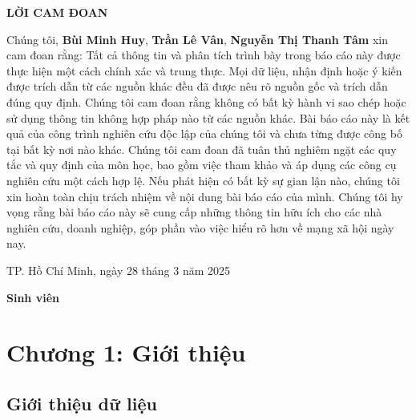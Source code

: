 \documentclass[
]{article}
\author{}
\date{\vspace{-2.5em}}
\begin{document}


\newpage
\thispagestyle{empty}

\begin{center}
    \LARGE \textbf{LỜI CAM ĐOAN}
\end{center}
\vspace{1em}

\setlength{\parindent}{2em}
\begin{flushright}
Chúng tôi, \textbf{Bùi Minh Huy}, \textbf{Trần Lê Vân}, \textbf{Nguyễn Thị Thanh Tâm} xin cam đoan rằng:
    Tất cả thông tin và phân tích trình bày trong báo cáo này được thực hiện một cách chính xác và trung thực. Mọi dữ liệu, nhận định hoặc ý kiến được trích dẫn từ các nguồn khác đều đã được nêu rõ nguồn gốc và trích dẫn đúng quy định. Chúng tôi cam đoan rằng không có bất kỳ hành vi sao chép hoặc sử dụng thông tin không hợp pháp nào từ các nguồn khác. Bài báo cáo này là kết quả của công trình nghiên cứu độc lập của chúng tôi và chưa từng được công bố tại bất kỳ nơi nào khác. Chúng tôi cam đoan đã tuân thủ nghiêm ngặt các quy tắc và quy định của môn học, bao gồm việc tham khảo và áp dụng các công cụ nghiên cứu một cách hợp lệ. Nếu phát hiện có bất kỳ sự gian lận nào, chúng tôi xin hoàn toàn chịu trách nhiệm về nội dung bài báo cáo của mình. Chúng tôi hy vọng rằng bài báo cáo này sẽ cung cấp những thông tin hữu ích cho các nhà nghiên cứu, doanh nghiệp, góp phần vào việc hiểu rõ hơn về mạng xã hội ngày nay.
\end{flushright}

\vspace{2em}

\begin{flushright}
    TP. Hồ Chí Minh, ngày 28 tháng 3 năm 2025

    \textbf{Sinh viên}
\end{flushright}

\newpage
\thispagestyle{empty}
\tableofcontents
\newpage
{}
\setcounter{page}{1}

\section{Chương 1: Giới
thiệu}\label{chux1b0ux1a1ng-1-giux1edbi-thiux1ec7u}

\subsection{Giới thiệu dữ
liệu}\label{giux1edbi-thiux1ec7u-dux1eef-liux1ec7u}
\end{document}
